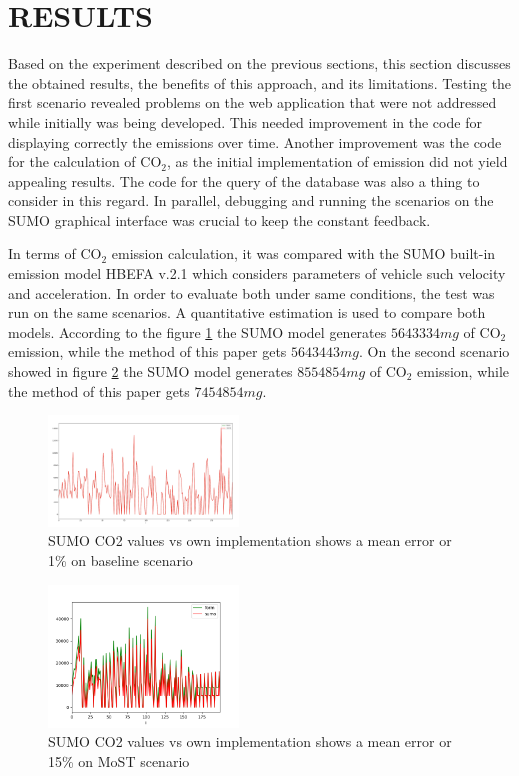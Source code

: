 \documentclass[letter, 10pt, conference]{ieeeconf}
\begin{document}
\section{RESULTS}

Based on the experiment described on the previous sections, this section discusses the obtained results, the benefits of this approach, and its limitations.
Testing the first scenario revealed problems on the web application that were not addressed while initially was being developed.
This needed improvement in the code for displaying correctly the emissions over time.
Another improvement was the code for the calculation of CO$_2$, as the initial implementation of emission did not yield appealing results.
The code for the query of the database was also a thing to consider in this regard.
In parallel, debugging and running the scenarios on the SUMO graphical interface was crucial to keep the constant feedback.

In terms of CO$_2$ emission calculation, it was compared with the SUMO built-in emission model HBEFA v.2.1 \cite{behrisch_second_2015} which considers parameters of vehicle such velocity and acceleration.
In order to evaluate both under same conditions, the test was run on the same scenarios.
A quantitative estimation is used to compare both models.
According to the figure \ref{fig:tartu_emissions_plot} the SUMO model generates $5643334 mg$ of CO$_2$ emission, while the method of this paper gets $5643443 mg$.
On the second scenario showed in figure \ref{fig:monaco_emissions_plot} the SUMO model generates $8554854 mg$ of CO$_2$ emission, while the method of this paper gets $7454854 mg$.

\begin{figure}[h]
  \centering
  \includegraphics[width=0.45\textwidth]{tartu_emissions_plot}
  \caption{SUMO CO2 values vs own implementation shows a mean error or 1\% on baseline scenario}
  \label{fig:tartu_emissions_plot}
\end{figure}

\begin{figure}[h]
  \centering
  \includegraphics[width=0.45\textwidth]{monaco_emissions_plot}
  \caption{SUMO CO2 values vs own implementation shows a mean error or 15\% on MoST scenario}
  \label{fig:monaco_emissions_plot}
\end{figure}
\end{document}
